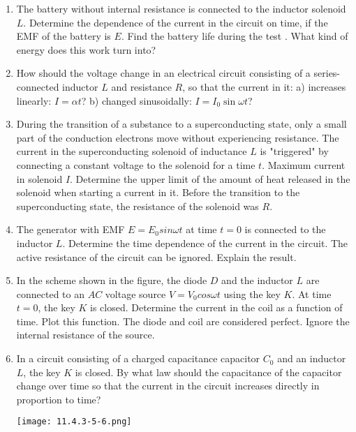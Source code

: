 \documentclass{article}
\begin{document}
\begin{enumerate}[label=11.4.\arabic*]

\item The battery without internal resistance is connected to the inductor solenoid $L$. Determine the dependence of the current in the circuit on time, if the EMF of the battery is $E$. Find the battery life during the test . What kind of energy does this work turn into?

\item How should the voltage change in an electrical circuit consisting of a series-connected inductor $L$ and resistance $R$, so that the current in it: a) increases linearly: $I = \alpha t$? b) changed sinusoidally: $I = I_0 \sin \omega t$?

\item During the transition of a substance to a superconducting state, only a small part of the conduction electrons move without experiencing resistance. The current in the superconducting solenoid of inductance $L$ is "triggered" by connecting a constant voltage to the solenoid for a time $t$. Maximum current in solenoid $I$. Determine the upper limit of the amount of heat released in the solenoid when starting a current in it. Before the transition to the superconducting state, the resistance of the solenoid was $R$.

\item The generator with EMF $E = E_0 sin \omega t$ at time $t = 0$ is connected to the inductor $L$. Determine the time dependence of the current in the circuit. The active resistance of the circuit can be ignored. Explain the result.

\item In the scheme shown in the figure, the diode $D$ and the inductor $L$ are connected to an $AC$ voltage source $V = V_0 cos \omega t$ using the key $K$. At time $t = 0$, the key $K$ is closed. Determine the current in the coil as a function of time. Plot this function. The diode and coil are considered perfect. Ignore the internal resistance of the source.

\item In a circuit consisting of a charged capacitance capacitor $C_0$ and an inductor $L$, the key $K$ is closed. By what law should the capacitance of the capacitor change over time so that the current in the circuit increases directly in proportion to time?

\begin{center}
    \texttt{[image: 11.4.3-5-6.png]}
\end{center}


\end{enumerate}
\end{document}
